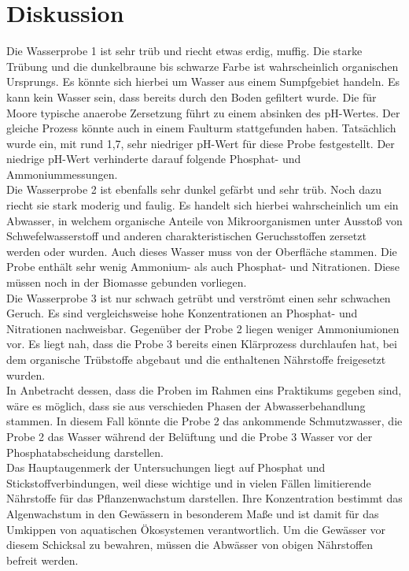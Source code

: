 \chapter{Diskussion}
\label{sec:diskussion}
Die Wasserprobe 1 ist sehr trüb und riecht etwas erdig, muffig. Die starke Trübung und die dunkelbraune bis schwarze Farbe ist wahrscheinlich organischen Ursprungs. Es könnte sich hierbei um Wasser aus einem Sumpfgebiet handeln. Es kann kein Wasser sein, dass bereits durch den Boden gefiltert wurde.
Die für Moore typische anaerobe Zersetzung führt zu einem absinken des pH-Wertes. Der gleiche Prozess könnte auch in einem Faulturm stattgefunden haben. Tatsächlich wurde ein, mit rund 1,7, sehr niedriger pH-Wert für diese Probe festgestellt. Der niedrige pH-Wert verhinderte darauf folgende Phosphat- und Ammoniummessungen.\\

Die Wasserprobe 2 ist ebenfalls sehr dunkel gefärbt und sehr trüb. Noch dazu riecht sie stark moderig und faulig. Es handelt sich hierbei wahrscheinlich um ein Abwasser, in welchem organische Anteile von Mikroorganismen unter Ausstoß von Schwefelwasserstoff und anderen charakteristischen Geruchsstoffen zersetzt werden oder wurden. Auch dieses Wasser muss von der Oberfläche stammen. Die Probe enthält sehr wenig Ammonium- als auch Phosphat- und Nitrationen. Diese müssen noch in der Biomasse gebunden vorliegen.\\

Die Wasserprobe 3 ist nur schwach getrübt und verströmt einen sehr schwachen Geruch. Es sind vergleichsweise hohe Konzentrationen an Phosphat- und Nitrationen nachweisbar. Gegenüber der Probe 2 liegen weniger Ammoniumionen vor. Es liegt nah, dass die Probe 3 bereits einen Klärprozess durchlaufen hat, bei dem organische Trübstoffe abgebaut und die enthaltenen Nährstoffe freigesetzt wurden.\\

In Anbetracht dessen, dass die Proben im Rahmen eins Praktikums gegeben sind, wäre es möglich, dass sie aus verschieden Phasen der Abwasserbehandlung stammen. In diesem Fall könnte die Probe 2 das ankommende Schmutzwasser, die Probe 2 das Wasser während der Belüftung und die Probe 3 Wasser vor der Phosphatabscheidung darstellen. \\

Das Hauptaugenmerk der Untersuchungen liegt auf Phosphat und Stickstoffverbindungen, weil diese wichtige und in vielen Fällen limitierende Nährstoffe für das Pflanzenwachstum darstellen. Ihre Konzentration bestimmt das Algenwachstum in den Gewässern in besonderem Maße und ist damit für das Umkippen von aquatischen Ökosystemen verantwortlich. Um die Gewässer vor diesem Schicksal zu bewahren, müssen die Abwässer von obigen Nährstoffen befreit werden.\\



